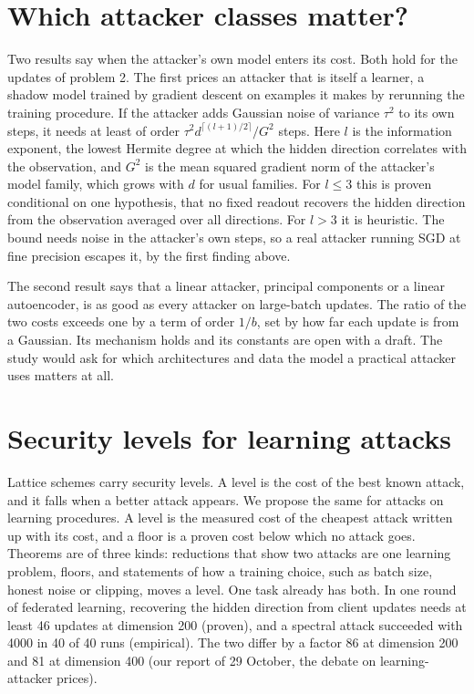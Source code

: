 \documentclass[10pt,a4paper]{article}
\begin{document}
\section{Which attacker classes matter?}

Two results say when the attacker's own model enters its cost. Both hold for the updates of problem 2. The first prices an attacker that is itself a learner, a shadow model trained by gradient descent on examples it makes by rerunning the training procedure. If the attacker adds Gaussian noise of variance $\tau^2$ to its own steps, it needs at least of order $\tau^2d^{\lceil(l+1)/2\rceil}/G^2$ steps. Here $l$ is the information exponent, the lowest Hermite degree at which the hidden direction correlates with the observation, and $G^2$ is the mean squared gradient norm of the attacker's model family, which grows with $d$ for usual families. For $l\le3$ this is proven conditional on one hypothesis, that no fixed readout recovers the hidden direction from the observation averaged over all directions. For $l>3$ it is heuristic. The bound needs noise in the attacker's own steps, so a real attacker running SGD at fine precision escapes it, by the first finding above.

The second result says that a linear attacker, principal components or a linear autoencoder, is as good as every attacker on large-batch updates. The ratio of the two costs exceeds one by a term of order $1/b$, set by how far each update is from a Gaussian. Its mechanism holds and its constants are open with a draft. The study would ask for which architectures and data the model a practical attacker uses matters at all.

\section{Security levels for learning attacks}

Lattice schemes carry security levels. A level is the cost of the best known attack, and it falls when a better attack appears. We propose the same for attacks on learning procedures. A level is the measured cost of the cheapest attack written up with its cost, and a floor is a proven cost below which no attack goes. Theorems are of three kinds: reductions that show two attacks are one learning problem, floors, and statements of how a training choice, such as batch size, honest noise or clipping, moves a level. One task already has both. In one round of federated learning, recovering the hidden direction from client updates needs at least 46 updates at dimension 200 (proven), and a spectral attack succeeded with 4000 in 40 of 40 runs (empirical). The two differ by a factor 86 at dimension 200 and 81 at dimension 400 (our report of 29 October, the debate on learning-attacker prices).
\end{document}

